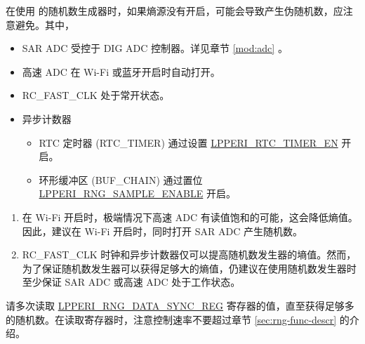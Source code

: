 \documentclass[main\_\_CN.tex]{subfiles}
\begin{document}
在使用 \chipname{} 的随机数生成器时，如果熵源没有开启，可能会导致产生伪随机数，应注意避免。其中，
\begin{itemize}
    \item SAR ADC 受控于 DIG ADC 控制器。详见章节 \ref{mod:adc} \textit{}。
    \item 高速 ADC 在 Wi-Fi 或蓝牙开启时自动打开。
    \item RC\_FAST\_CLK 处于常开状态。
    \item 异步计数器
        \begin{itemize}
            \item RTC 定时器 (RTC\_TIMER) 通过设置 \hyperref[fielddesc:LPPERIRTCTIMEREN]{LPPERI\_RTC\_TIMER\_EN} 开启。
            \item 环形缓冲区 (BUF\_CHAIN) 通过置位 \hyperref[fielddesc:LPPERIRNGSAMPLEENABLE]{LPPERI\_RNG\_SAMPLE\_ENABLE} 开启。
        \end{itemize}
\end{itemize}
\begin{tiplisting}
\vspace{-2.5em}
\begin{enumerate}
    \label{others:rng-note-clock-seed}
    \item 在 Wi-Fi 开启时，极端情况下高速 ADC 有读值饱和的可能，这会降低熵值。因此，建议在 Wi-Fi 开启时，同时打开 SAR ADC 产生随机数。
    \item RC\_FAST\_CLK 时钟和异步计数器仅可以提高随机数发生器的墒值。然而，为了保证随机数发生器可以获得足够大的熵值，仍建议在使用随机数发生器时至少保证 SAR ADC 或高速 ADC 处于工作状态。
\end{enumerate}
\end{tiplisting}

请多次读取 \hyperref[regdesc:LPPERIRNGDATASYNCREG]{LPPERI\_RNG\_DATA\_SYNC\_REG} 寄存器的值，直至获得足够多的随机数。在读取寄存器时，注意控制速率不要超过章节 \ref{sec:rng-func-descr} 的介绍。
\end{document}
